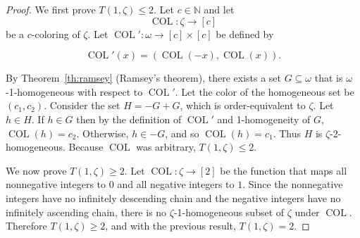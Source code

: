 \documentclass[11pt]{article}
\newcommand{\om}{\omega}
\newcommand{\setconcat}{+}
\newcommand{\COL}{\operatorname{COL}}
\newcommand{\N}{\mathbb{N}}
\newcommand{\numcolors}{c}
\theoremstyle{plain}
\theoremstyle{definition}
\begin{document}
\begin{proof}
We first prove $T(1,\zeta)\leq 2$. Let $\numcolors \in \N$ and let $$\COL\colon \zeta\to [\numcolors]$$ be a 
$\numcolors$-coloring of $\zeta$.
Let $\COL'\colon \omega \to [\numcolors]\times[\numcolors]$ be defined by 

$$\COL'(x) = (\COL(-x),\COL(x)).$$

By Theorem~\ref{th:ramsey} (Ramsey's theorem), there exists a set $G \subseteq \om$
that is $\om$-1-homogeneous with respect to $\COL'$. Let the color of the homogeneous set be $(c_1, c_2)$.
Consider the set $H=-G \setconcat G$, which is order-equivalent to $\zeta$. Let $h \in H$. If $h 
\in G$ then by the definition of $\COL'$ and 1-homogeneity of $G$, $\COL(h)=c_2$. Otherwise, $h\in -G$, and so $\COL(h)=c_1$. Thus $H$ is $\zeta$-2-homogeneous. Because $\COL$ was arbitrary, $T(1,\zeta)\leq 2$.

We now prove $T(1,\zeta)\geq 2$. Let $\COL\colon\zeta\to [2]$ be the function
that maps all nonnegative integers to $0$ and all
negative integers to $1$.
Since the nonnegative integers have no infinitely descending chain and the negative integers have no infinitely ascending chain, there is no $\zeta$-1-homogeneous subset of $\zeta$ under $\COL$. Therefore $T(1,\zeta)\geq 2$, and with the previous result, $T(1,\zeta) = 2$.
\end{proof}
\end{document}
